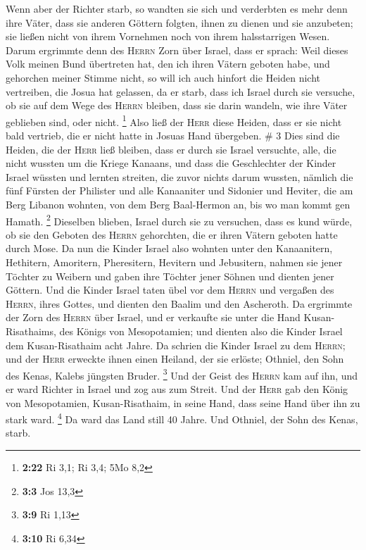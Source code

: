  Wenn aber der Richter starb, so wandten sie sich und
verderbten es mehr denn ihre Väter, dass sie anderen Göttern folgten,
ihnen zu dienen und sie anzubeten; sie ließen nicht von ihrem Vornehmen
noch von ihrem halsstarrigen Wesen.  Darum ergrimmte denn
des \textsc{Herrn} Zorn über Israel, dass er sprach: Weil dieses Volk
meinen Bund übertreten hat, den ich ihren Vätern geboten habe, und
gehorchen meiner Stimme nicht,  so will ich auch hinfort
die Heiden nicht vertreiben, die Josua hat gelassen, da er starb,
 dass ich Israel durch sie versuche, ob sie auf dem Wege
des \textsc{Herrn} bleiben, dass sie darin wandeln, wie ihre Väter
geblieben sind, oder nicht. \footnote{\textbf{2:22} Ri 3,1; Ri 3,4; 5Mo
  8,2}  Also ließ der \textsc{Herr} diese Heiden, dass er
sie nicht bald vertrieb, die er nicht hatte in Josuas Hand übergeben. \#
3  Dies sind die Heiden, die der \textsc{Herr} ließ
bleiben, dass er durch sie Israel versuchte, alle, die nicht wussten um
die Kriege Kanaans,  und dass die Geschlechter der Kinder
Israel wüssten und lernten streiten, die zuvor nichts darum wussten,
 nämlich die fünf Fürsten der Philister und alle
Kanaaniter und Sidonier und Heviter, die am Berg Libanon wohnten, von
dem Berg Baal-Hermon an, bis wo man kommt gen Hamath. \footnote{\textbf{3:3}
  Jos 13,3}  Dieselben blieben, Israel durch sie zu
versuchen, dass es kund würde, ob sie den Geboten des \textsc{Herrn}
gehorchten, die er ihren Vätern geboten hatte durch Mose. 
Da nun die Kinder Israel also wohnten unter den Kanaanitern, Hethitern,
Amoritern, Pheresitern, Hevitern und Jebusitern,  nahmen
sie jener Töchter zu Weibern und gaben ihre Töchter jener Söhnen und
dienten jener Göttern.  Und die Kinder Israel taten übel
vor dem \textsc{Herrn} und vergaßen des \textsc{Herrn}, ihres Gottes,
und dienten den Baalim und den Ascheroth.  Da ergrimmte
der Zorn des \textsc{Herrn} über Israel, und er verkaufte sie unter die
Hand Kusan-Risathaims, des Königs von Mesopotamien; und dienten also die
Kinder Israel dem Kusan-Risathaim acht Jahre.  Da schrien
die Kinder Israel zu dem \textsc{Herrn}; und der \textsc{Herr} erweckte
ihnen einen Heiland, der sie erlöste; Othniel, den Sohn des Kenas,
Kalebs jüngsten Bruder. \footnote{\textbf{3:9} Ri 1,13} 
Und der Geist des \textsc{Herrn} kam auf ihn, und er ward Richter in
Israel und zog aus zum Streit. Und der \textsc{Herr} gab den König von
Mesopotamien, Kusan-Risathaim, in seine Hand, dass seine Hand über ihn
zu stark ward. \footnote{\textbf{3:10} Ri 6,34}  Da ward
das Land still 40 Jahre. Und Othniel, der Sohn des Kenas, starb.

